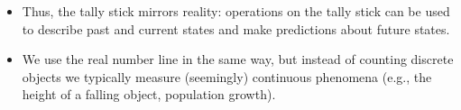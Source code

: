 \documentclass[letterpaper,12pt,fleqn]{article}
\begin{document}
\begin{itemize}[left=0in]
\begin{center}
  \end{center}

\item Thus, the tally stick mirrors reality: operations on the tally stick can be used to describe past and current
  states and make predictions about future states.

\item We use the real number line in the same way, but instead of counting discrete objects we typically measure
  (seemingly) continuous phenomena (e.g., the height of a falling object, population growth).

\end{itemize}
\end{document}
